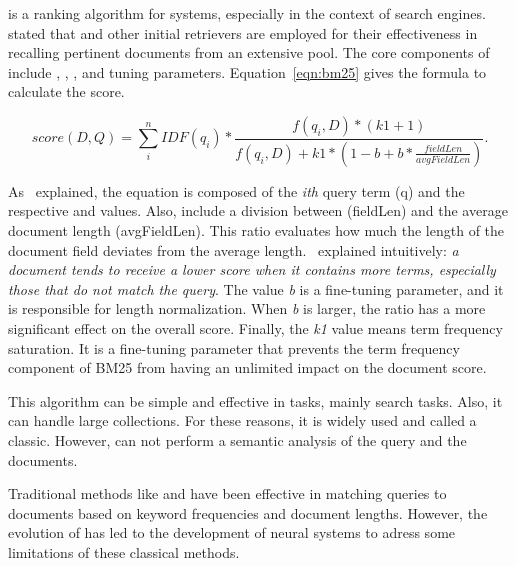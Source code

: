 {\bm} is a ranking algorithm for {\ir} systems, especially in the context of search engines.~\citet{hambarde_information_2023} stated that {\bm} and other initial retrievers are employed for their effectiveness in recalling pertinent documents from an extensive pool. The core components of {\bm} include {\tf}, {\idf}, {\dl}, and tuning parameters. Equation~\ref{eqn:bm25} gives the formula to calculate the {\bm} score.

\begin{equation}
score(D,Q) = \sum_{i}^{n} IDF(q_{i}) \ast \frac{f(q_{i},D) \ast (k1 + 1)}{f(q_{i},D) + k1 \ast (1 - b + b \ast \frac{fieldLen}{avgFieldLen})}.
\label{eqn:bm25}
\end{equation}

As~\citet{phd_understanding_2023} explained, the {\bm} equation is composed of the \textit{ith} query term (q) and the respective {\idf} and {\tf} values. Also, include a division between {\dl} (fieldLen) and the average document length (avgFieldLen). This ratio evaluates how much the length of the document field deviates from the average length.~\citet{noauthor_practical_2018} explained intuitively: \textit{a document tends to receive a lower score when it contains more terms, especially those that do not match the query}. The value \textit{b} is a fine-tuning parameter, and it is responsible for length normalization. When \textit{b} is larger, the ratio has a more significant effect on the overall score. Finally, the \textit{k1} value means term frequency saturation. It is a fine-tuning parameter that prevents the term frequency component of BM25 from having an unlimited impact on the document score.

This algorithm can be simple and effective in {\ir} tasks, mainly search tasks. Also, it can handle large collections. For these reasons, it is widely used and called a classic. However, {\bm} can not perform a semantic analysis of the query and the documents.



Traditional {\ir} methods like {\tfidf} and {\bm} have been effective in matching queries to documents based on keyword frequencies and document lengths. However, the evolution of {\ai} has led to the development of neural {\ir} systems to adress some limitations of these classical methods.



